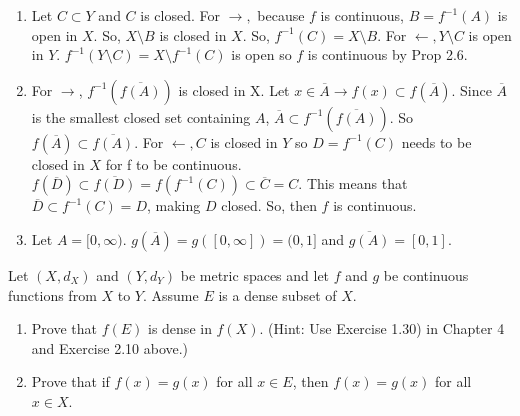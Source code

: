 \documentclass[12pt,letterpaper,boxed]{hmcpset}
\begin{document}
\begin{solution}
\begin{enumerate}
        \itemsep0em
        \item Let $C\subset Y$ and $C$ is closed. For $\rightarrow,$ because $f$ is continuous, $B=f^{-1}(A)$ is open in $X.$ So, $X\setminus B$ is closed in $X$. So, $f^{-1}(C) = X\setminus B$. For $\leftarrow, Y\setminus C$ is open in $Y$. $f^{-1}(Y\setminus C) = X\setminus f^{-1}(C)$ is open so $f$ is continuous by Prop 2.6.  
        \item For $\rightarrow$, $f^{-1}(\overline{f(A)})$ is closed in X. Let $x \in \overline{A}\rightarrow f(x)\subset f(\overline{A})$. Since $\overline{A}$ is the smallest closed set containing $A$, $\overline{A}\subset f^{-1}(\overline{f(A)})$. So $f(\overline{A})\subset\overline{f(A)}$. For $\leftarrow, C$ is closed in $Y$ so $D = f^{-1}(C)$ needs to be closed in $X$ for f to be continuous. $f(\overline{D})\subset \overline{f(D)}=f(f^{-1}(C))\subset \overline{C}=C$. This means that $\overline{D}\subset f^{-1}(C)=D$, making $D$ closed. So, then $f$ is continuous. 
        \item Let $A=[0,\infty)$. $g(\overline{A})=g([0,\infty]) = (0,1]$ and $\overline{g(A)}=[0,1].$
    \end{enumerate}
\end{solution}

\begin{problem}[Exercise 2.11]
Let $(X, d_X)$ and $(Y, d_Y)$ be metric spaces and let $f$ and $g$ be continuous functions from $X$ to $Y$. Assume $E$ is a dense subset of $X$.
\vspace{-2mm}
\begin{enumerate}
    \itemsep0em
    \item Prove that $f(E)$ is dense in $f(X).$ (Hint: Use Exercise 1.30) in Chapter 4 and Exercise 2.10 above.)
    \item Prove that if $f(x) = g(x)$ for all $x \in E$, then $f(x) = g(x)$ for all $x\in X$.
\end{enumerate} 
\end{problem}
\end{document}
